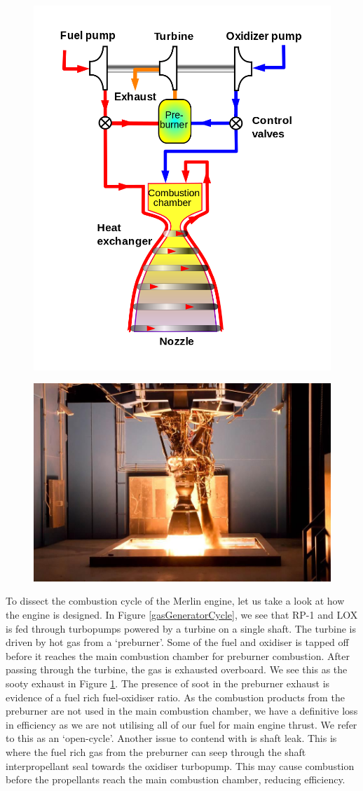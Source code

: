 \documentclass[11pt]{article}
\numberwithin{equation}{section}
\begin{document}
\begin{figure}[H]
    \centering
    \begin{minipage}{.5\textwidth}
        \centering
        \includegraphics[height = 30ex]{./img/openCycle.png}
        \label{gasGeneratorCycle}
    \end{minipage}%
    \begin{minipage}{.5\textwidth}
        \centering
        \includegraphics[height = 30ex]{./img/merlinTest.jpg}
        \label{merlinTest}
    \end{minipage}
\end{figure}

To dissect the combustion cycle of the Merlin engine, let us take a look at how the engine is designed. In Figure \ref{gasGeneratorCycle}, we see that RP-1 and LOX is fed through turbopumps powered by a turbine on a single shaft. The turbine is driven by hot gas from a `preburner'. Some of the fuel and oxidiser is tapped off before it reaches the main combustion chamber for preburner combustion. After passing through the turbine, the gas is exhausted overboard. We see this as the sooty exhaust in Figure \ref{merlinTest}. The presence of soot in the preburner exhaust is evidence of a fuel rich fuel-oxidiser ratio. As the combustion products from the preburner are not used in the main combustion chamber, we have a definitive loss in efficiency as we are not utilising all of our fuel for main engine thrust. We refer to this as an `open-cycle'. Another issue to contend with is shaft leak. This is where the fuel rich gas from the preburner can seep through the shaft interpropellant seal towards the oxidiser turbopump. This may cause combustion before the propellants reach the main combustion chamber, reducing efficiency.
\end{document}
